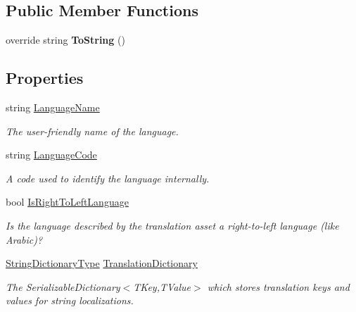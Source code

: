 \subsection*{Public Member Functions}
\begin{DoxyCompactItemize}
\item 
override string {\bfseries To\+String} ()\hypertarget{class_translation_asset_a2dbeddca8e91a58cfc33a703c04445c0}{}\label{class_translation_asset_a2dbeddca8e91a58cfc33a703c04445c0}

\end{DoxyCompactItemize}
\subsection*{Properties}
\begin{DoxyCompactItemize}
\item 
string \hyperlink{class_translation_asset_a85c98c092730390bc574a75f5e1dca50}{Language\+Name}
\begin{DoxyCompactList}\small\item\em The user-\/friendly name of the language. \end{DoxyCompactList}\item 
string \hyperlink{class_translation_asset_a77f3ad37c6e582d64fce3dce103133d7}{Language\+Code}
\begin{DoxyCompactList}\small\item\em A code used to identify the language internally. \end{DoxyCompactList}\item 
bool \hyperlink{class_translation_asset_a63b9ef3eaf6d598babbced5f0df2a947}{Is\+Right\+To\+Left\+Language}
\begin{DoxyCompactList}\small\item\em Is the language described by the translation asset a right-\/to-\/left language (like Arabic)? \end{DoxyCompactList}\item 
\hyperlink{class_translation_asset_1_1_string_dictionary_type}{String\+Dictionary\+Type} \hyperlink{class_translation_asset_a313f9943f1dc9f48fb45633452093f1b}{Translation\+Dictionary}
\begin{DoxyCompactList}\small\item\em The Serializable\+Dictionary$<$\+T\+Key,\+T\+Value$>$ which stores translation keys and values for string localizations. \end{DoxyCompactList}\item 

\end{DoxyCompactItemize}
